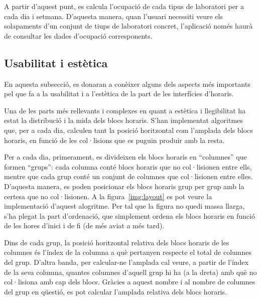 \documentclass[a4paper,12pt]{ThesisStyle}
\begin{document}
A partir d'aquest punt, es calcula l'ocupació de cada tipus de laboratori per a cada dia i setmana. D'aquesta manera, quan l'usuari necessiti veure els solapaments d'un conjunt de tiups de laboratori concret, l'aplicació només haurà de consultar les dades d'ocupació corresponents.

\newpage

\subsection{Usabilitat i estètica}
\label{subsec:usabilitat_estetica}

En aquesta subsecció, es donaran a conèixer alguns dels aspects més importants pel que fa a la usabilitat i a l'estètica de la part de les interfícies d'horaris.

Una de les parts més rellevants i complexes en quant a estètica i llegibilitat ha estat la distribució i la mida dels blocs horaris. S'han implementat algoritmes que, per a cada dia, calculen tant la posició horitzontal com l'amplada dels blocs horaris, en funció de les col·lisions que es puguin produir amb la resta.

Per a cada dia, primerament, es divideixen els blocs horaris en ``columnes'' que formen ``grups'': cada columna conté blocs horaris que no col·lisionen entre ells, mentre que cada grup conté un conjunt de columnes que col·lisionen entre elles. D'aquesta manera, es poden posicionar els blocs horaris grup per grup amb la certesa que no col·lisionen. A la figura~\ref{img:layout} es pot veure la implementació d'aquest alogritme. Per tal que la figura no quedi massa llarga, s'ha plegat la part d'ordenació, que simplement ordena els blocs horaris en funció de les hores d'inici i de fi (de més aviat a més tard).

Dins de cada grup, la posició horitzontal relativa dels blocs horaris de les columnes és l'índex de la columna a què pertanyen respecte el total de columnes del grup. D'altra banda, per calcular-ne l'amplada cal veure, a partir de l'índex de la seva columna, quantes columnes d'aquell grup hi ha (a la dreta) amb què no col·lisiona amb cap dels blocs. Gràcies a aquest nombre i al nombre de columnes del grup en qüestió, es pot calcular l'amplada relativa dels blocs horaris.

\newpage
\end{document}
